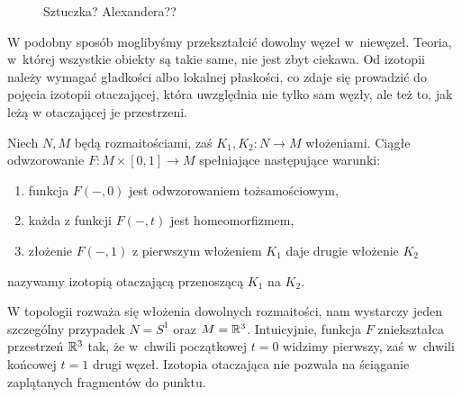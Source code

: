 \begin{figure}[H]
    \centering

    \caption[caption-for-lof-2]{Sztuczka? Alexandera??}
\end{figure}

W podobny sposób moglibyśmy przekształcić dowolny węzeł w~niewęzeł.
Teoria, w~której wszystkie obiekty są takie same, nie jest zbyt ciekawa.
Od izotopii należy wymagać gładkości albo lokalnej płaskości,
co zdaje się prowadzić do pojęcia izotopii otaczającej, która uwzględnia nie tylko sam węzły, ale też to, jak leżą w otaczającej je przestrzeni.

\begin{definition}
%
    Niech $N, M$ będą rozmaitościami, zaś $K_1, K_2 \colon N \to M$ włożeniami.
    Ciągłe odwzorowanie $F \colon M \times [0,1] \to M$ spełniające następujące warunki:
    \begin{enumerate}
        \item funkcja $F(-, 0)$ jest odwzorowaniem tożsamościowym,
        \item każda z funkcji $F(-, t)$ jest homeomorfizmem,
        \item złożenie $F(-, 1)$ z pierwszym włożeniem $K_1$ daje drugie włożenie $K_2$
    \end{enumerate}
    nazywamy izotopią otaczającą przenoszącą $K_1$ na $K_2$.
\end{definition}

W topologii rozważa się włożenia dowolnych rozmaitości, nam wystarczy jeden szczególny przypadek $N = S^1$ oraz $M = \mathbb R^3$.
Intuicyjnie, funkcja $F$ zniekształca przestrzeń $\mathbb R^3$ tak, że w~chwili początkowej $t = 0$ widzimy pierwszy, zaś w~chwili końcowej $t = 1$ drugi węzeł.
Izotopia otaczająca nie pozwala na ściąganie zaplątanych fragmentów do punktu.

